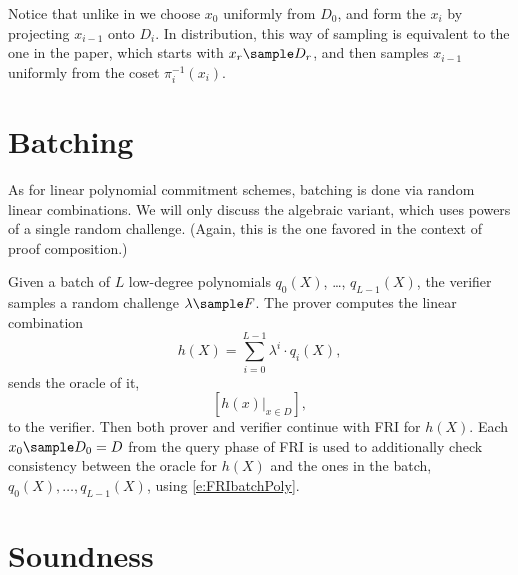 \documentclass[11pt,article,oneside]{memoir}
\theoremstyle{definition}
\theoremstyle{remark}
\begin{document}
Notice that unlike in \cite{ProximityGaps} we choose $x_0$ uniformly from $D_0$, and form the $x_i$ by projecting $x_{i-1}$ onto $D_i$. 
In distribution, this way of sampling is equivalent to the one in the paper, which starts with $x_r\sample D_r$,  and then samples $x_{i-1}$ uniformly from the coset  $\pi_i^{-1}(x_i)$.

\section{Batching}
As for linear polynomial commitment schemes, batching is done via random linear combinations. 
We will only discuss the algebraic variant, which uses powers of a single random challenge. 
(Again, this is the one favored in the context of proof composition.)

Given a batch of $L$ low-degree polynomials $q_0(X)$, \ldots, $q_{L-1}(X)$, the verifier samples a random challenge $\lambda\sample F$. 
The prover computes the linear combination
\begin{equation}
\label{e:FRIbatchPoly}
h(X) = \sum_{i=0}^{L-1} \lambda^i\cdot q_i(X),
\end{equation}
sends the oracle of it,
\[
[h(x)|_{x\in D}],
\]
to the verifier.
Then both prover and verifier continue with FRI for $h(X)$. 
Each $x_0\sample D_0=D$ from the query phase of FRI is used to additionally check consistency between the oracle for $h(X)$ and the ones in the batch, $q_0(X),\ldots, q_{L-1}(X)$, using \eqref{e:FRIbatchPoly}. 


\section{Soundness}





\end{document}
